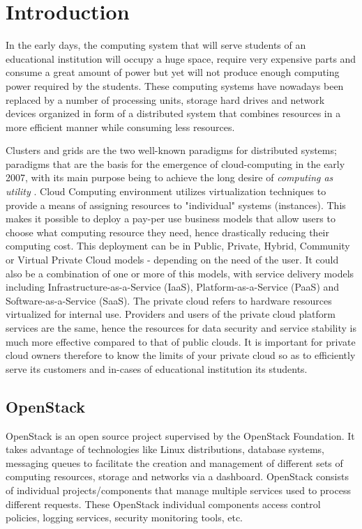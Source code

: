 \chapter{Introduction}\label{chapter:introduction}
\setcounter{page}{1}
In the early days, the computing system that will serve students of an educational institution will occupy a huge space, require very expensive parts and consume a great amount of power but yet will not produce enough computing power required by the students. These computing systems have nowadays been replaced by a number of processing units, storage hard drives and network devices organized in form of a distributed system that combines resources in a more efficient manner while consuming less resources.
\par \setlength{\parskip}{1em}
Clusters and grids are the two well-known paradigms for distributed systems; paradigms that are the basis for the emergence of cloud-computing in the early 2007, with its main purpose being to achieve the long desire of \textit{computing as utility} \cite{corbato1965introduction}. Cloud Computing environment utilizes virtualization techniques to provide a means of assigning resources to "individual" systems (instances). This makes it possible to deploy a pay-per use business models that allow users to choose what computing resource they need, hence drastically reducing their computing cost. This deployment can be in Public, Private, Hybrid, Community or Virtual Private Cloud models - depending on the need of the user. It could also be a combination of one or more of this models, with service delivery models including Infrastructure-as-a-Service (IaaS), Platform-as-a-Service (PaaS) and Software-as-a-Service (SaaS). The private cloud refers to hardware resources virtualized for internal use. Providers and users of the private cloud platform services are the same, hence the resources for data security and service stability is much more effective compared to that of public clouds. It is important for private cloud owners therefore to know the limits of your private cloud so as to efficiently serve its customers and in-cases of educational institution its students.

\section{OpenStack}
OpenStack is an open source project supervised by the OpenStack Foundation. It takes advantage of technologies like Linux distributions, database systems, messaging queues to facilitate the creation and management of different sets of computing resources, storage and networks via a dashboard. OpenStack consists of individual projects/components that manage multiple services used to process different requests. These OpenStack individual components access control policies, logging services, security monitoring tools, etc.

